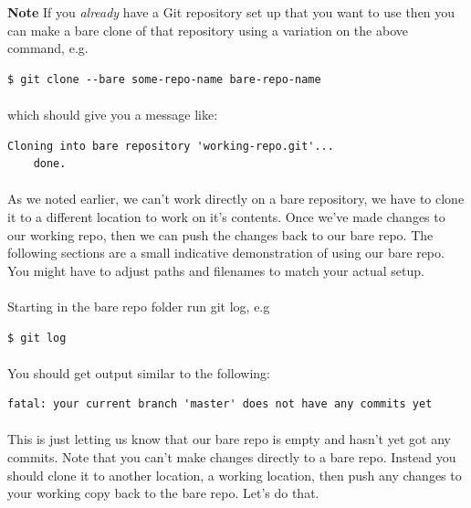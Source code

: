 \documentclass[12pt, a4paper, oneside]{book}
\begin{document}
{\begin{framed}
\textbf{Note} If you \emph{already} have a Git repository set up that you want to use then you can make a bare clone of that repository using a variation on the above command, e.g.

\begin{lstlisting}[style=DOS]
    $ git clone --bare some-repo-name bare-repo-name
\end{lstlisting}

\paragraph{} which should give you a message like:

\begin{lstlisting}[style=DOS]
    Cloning into bare repository 'working-repo.git'...
    done.
\end{lstlisting}
\end{framed}

\paragraph{} As we noted earlier, we can't work directly on a bare repository, we have to clone it to a different location to work on it's contents. Once we've made changes to our working repo, then we can push the changes back to our bare repo. The following sections are a small indicative demonstration of using our bare repo. You might have to adjust paths and filenames to match your actual setup.

\paragraph{} Starting in the bare repo folder run git log, e.g

\begin{lstlisting}[style=DOS]
    $ git log
\end{lstlisting}

\paragraph{} You should get output similar to the following:

\begin{lstlisting}[style=DOS]
    fatal: your current branch 'master' does not have any commits yet
\end{lstlisting}

\paragraph{} This is just letting us know that our bare repo is empty and hasn't yet got any commits. Note that you can't make changes directly to a bare repo. Instead you should clone it to another location, a working location, then push any changes to your working copy back to the bare repo. Let's do that.

}
\end{document}
